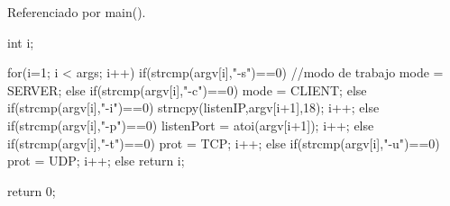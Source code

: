 Referenciado por main().


\begin{DoxyCode}
                                             {
        int i;
        
        for(i=1; i < args; i++) {
                if(strcmp(argv[i],"-s")==0) {
                        //modo de trabajo
                        mode = SERVER;
                } else if(strcmp(argv[i],"-c")==0) {
                        mode = CLIENT;
                } else if(strcmp(argv[i],"-i")==0) {
                        strncpy(listenIP,argv[i+1],18);
                        i++;
                } else if(strcmp(argv[i],"-p")==0) {
                        listenPort = atoi(argv[i+1]);
                        i++;
                } else if(strcmp(argv[i],"-t")==0) {
                        prot = TCP;
                        i++;
                } else if(strcmp(argv[i],"-u")==0) {
                        prot = UDP;     
                        i++;
                }               
                else {
                        return i;
                }
        }
        
        return 0;
}
\end{DoxyCode}

